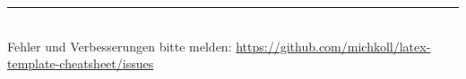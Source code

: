 \rule{0.3\linewidth}{0.25pt}
\\Fehler und Verbesserungen bitte melden: \url{https://github.com/michkoll/latex-template-cheatsheet/issues}
\scriptsize


